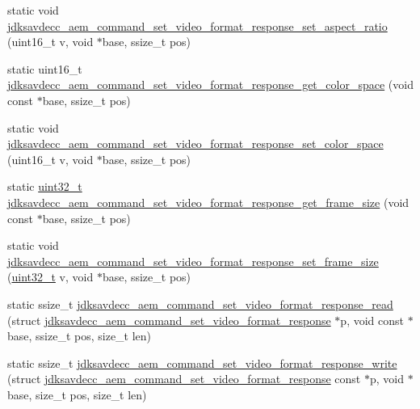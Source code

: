 \begin{DoxyCompactItemize}
\item 
static void \hyperlink{group__command__set__video__format__response_gad9cdd4240faf09bb8e7767a1c6874bfc}{jdksavdecc\+\_\+aem\+\_\+command\+\_\+set\+\_\+video\+\_\+format\+\_\+response\+\_\+set\+\_\+aspect\+\_\+ratio} (uint16\+\_\+t v, void $\ast$base, ssize\+\_\+t pos)
\item 
static uint16\+\_\+t \hyperlink{group__command__set__video__format__response_ga1f748dd4eec12b7c2a5f14a6d8bb5a44}{jdksavdecc\+\_\+aem\+\_\+command\+\_\+set\+\_\+video\+\_\+format\+\_\+response\+\_\+get\+\_\+color\+\_\+space} (void const $\ast$base, ssize\+\_\+t pos)
\item 
static void \hyperlink{group__command__set__video__format__response_ga55f80b2eae9f518a2ec66c83f9499984}{jdksavdecc\+\_\+aem\+\_\+command\+\_\+set\+\_\+video\+\_\+format\+\_\+response\+\_\+set\+\_\+color\+\_\+space} (uint16\+\_\+t v, void $\ast$base, ssize\+\_\+t pos)
\item 
static \hyperlink{parse_8c_a6eb1e68cc391dd753bc8ce896dbb8315}{uint32\+\_\+t} \hyperlink{group__command__set__video__format__response_gaf9b9b9778a5a6c8c494596e02ba3e0c0}{jdksavdecc\+\_\+aem\+\_\+command\+\_\+set\+\_\+video\+\_\+format\+\_\+response\+\_\+get\+\_\+frame\+\_\+size} (void const $\ast$base, ssize\+\_\+t pos)
\item 
static void \hyperlink{group__command__set__video__format__response_gaa2ae1f87ca806dbfc8f632b7f17fed3e}{jdksavdecc\+\_\+aem\+\_\+command\+\_\+set\+\_\+video\+\_\+format\+\_\+response\+\_\+set\+\_\+frame\+\_\+size} (\hyperlink{parse_8c_a6eb1e68cc391dd753bc8ce896dbb8315}{uint32\+\_\+t} v, void $\ast$base, ssize\+\_\+t pos)
\item 
static ssize\+\_\+t \hyperlink{group__command__set__video__format__response_ga97f2c77f6d260ff1660535178f752abe}{jdksavdecc\+\_\+aem\+\_\+command\+\_\+set\+\_\+video\+\_\+format\+\_\+response\+\_\+read} (struct \hyperlink{structjdksavdecc__aem__command__set__video__format__response}{jdksavdecc\+\_\+aem\+\_\+command\+\_\+set\+\_\+video\+\_\+format\+\_\+response} $\ast$p, void const $\ast$base, ssize\+\_\+t pos, size\+\_\+t len)
\item 
static ssize\+\_\+t \hyperlink{group__command__set__video__format__response_ga71bfe976b5b50c1fc0396e9fbb440ceb}{jdksavdecc\+\_\+aem\+\_\+command\+\_\+set\+\_\+video\+\_\+format\+\_\+response\+\_\+write} (struct \hyperlink{structjdksavdecc__aem__command__set__video__format__response}{jdksavdecc\+\_\+aem\+\_\+command\+\_\+set\+\_\+video\+\_\+format\+\_\+response} const $\ast$p, void $\ast$base, size\+\_\+t pos, size\+\_\+t len)
\end{DoxyCompactItemize}


